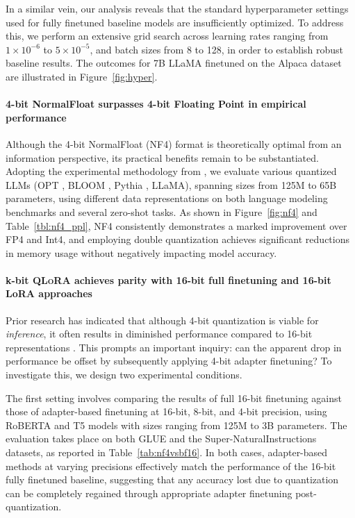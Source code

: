 In a similar vein, our analysis reveals that the standard hyperparameter settings used for fully finetuned baseline models are insufficiently optimized. To address this, we perform an extensive grid search across learning rates ranging from $1 \times 10^{-6}$ to $5 \times 10^{-5}$, and batch sizes from 8 to 128, in order to establish robust baseline results. The outcomes for 7B LLaMA finetuned on the Alpaca dataset are illustrated in Figure~\ref{fig:hyper}.

\paragraph{4-bit NormalFloat surpasses 4-bit Floating Point in empirical performance}

Although the 4-bit NormalFloat (NF4) format is theoretically optimal from an information perspective, its practical benefits remain to be substantiated. Adopting the experimental methodology from \citet{dettmers2022case}, we evaluate various quantized LLMs (OPT \citep{zhang2022opt}, BLOOM \cite{scao2022bloom}, Pythia \cite{biderman2023pythia}, LLaMA), spanning sizes from 125M to 65B parameters, using different data representations on both language modeling benchmarks and several zero-shot tasks. As shown in Figure~\ref{fig:nf4} and Table~\ref{tbl:nf4_ppl}, NF4 consistently demonstrates a marked improvement over FP4 and Int4, and employing double quantization achieves significant reductions in memory usage without negatively impacting model accuracy.

\paragraph{k-bit \textsc{QLoRA} achieves parity with 16-bit full finetuning and 16-bit LoRA approaches} 

Prior research has indicated that although 4-bit quantization is viable for \emph{inference}, it often results in diminished performance compared to 16-bit representations \citep{dettmers2022case,frantar2022gptq}. This prompts an important inquiry: can the apparent drop in performance be offset by subsequently applying 4-bit adapter finetuning? To investigate this, we design two experimental conditions.

The first setting involves comparing the results of full 16-bit finetuning against those of adapter-based finetuning at 16-bit, 8-bit, and 4-bit precision, using RoBERTA and T5 models with sizes ranging from 125M to 3B parameters. The evaluation takes place on both GLUE and the Super-NaturalInstructions datasets, as reported in Table~\ref{tab:nf4vsbf16}. In both cases, adapter-based methods at varying precisions effectively match the performance of the 16-bit fully finetuned baseline, suggesting that any accuracy lost due to quantization can be completely regained through appropriate adapter finetuning post-quantization.

